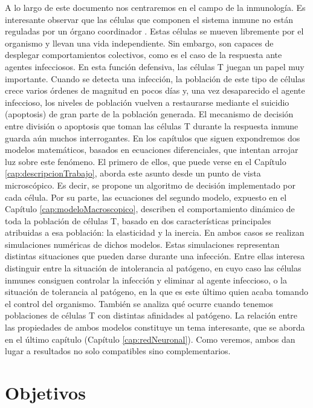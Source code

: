 A lo largo de este documento nos centraremos en el campo de la inmunología. Es interesante observar que las células que componen el sistema inmune no están reguladas por un órgano coordinador \citep{arias2016emergent}. Estas células se mueven libremente por el organismo y llevan una vida independiente. Sin embargo, son capaces de desplegar comportamientos colectivos, como es el caso de la respuesta ante agentes infecciosos. En esta función defensiva, las células T juegan un papel muy importante. Cuando se detecta una infección, la población de este tipo de células crece varios órdenes de magnitud en pocos días y, una vez desaparecido el agente infeccioso, los niveles de población vuelven a restaurarse mediante el suicidio (apoptosis) de gran parte de la población generada. El mecanismo de decisión entre división o apoptosis que toman las células T durante la respuesta inmune guarda aún muchos interrogantes. En los capítulos que siguen expondremos dos modelos matemáticos, basados en ecuaciones diferenciales, que intentan arrojar luz sobre este fenómeno. El primero de ellos, que puede verse en el Capítulo \ref{cap:descripcionTrabajo}, aborda este asunto desde un punto de vista microscópico. Es decir, se propone un algoritmo de decisión implementado por cada célula. Por su parte, las ecuaciones del segundo modelo, expuesto en el Capítulo \ref{cap:modeloMacroscopico}, describen el comportamiento dinámico de toda la población de células T, basado en dos características principales  atribuidas a esa población: la elasticidad y la inercia. En ambos casos se realizan simulaciones numéricas de dichos modelos. Estas simulaciones representan distintas situaciones que pueden darse durante una infección. Entre ellas interesa distinguir entre la situación de intolerancia al patógeno, en cuyo caso las células inmunes consiguen controlar la infección y eliminar al agente infeccioso, o la situación de tolerancia al patógeno, en la que es este último quien acaba tomando el control del organismo. También se analiza qué ocurre cuando tenemos poblaciones de células T con distintas afinidades al patógeno. La relación entre las propiedades de ambos modelos constituye un tema interesante, que se aborda en el último capítulo (Capítulo \ref{cap:redNeuronal}). Como veremos, ambos dan lugar a resultados no solo compatibles sino complementarios. 


\section{Objetivos}

